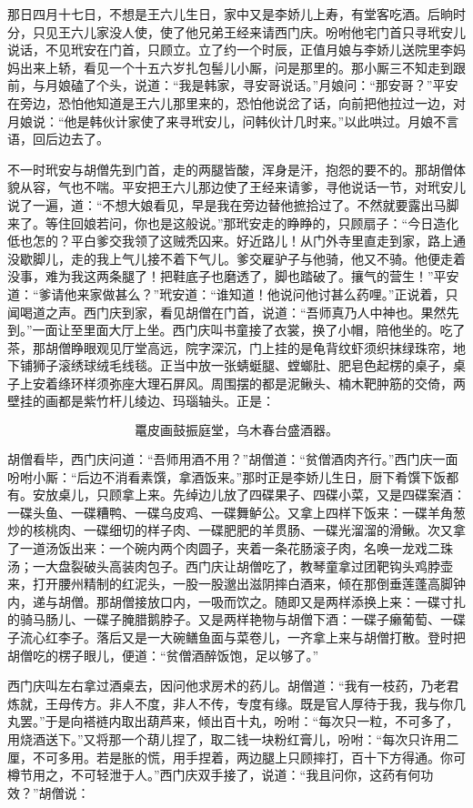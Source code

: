 那日四月十七日，不想是王六儿生日，家中又是李娇儿上寿，有堂客吃酒。后晌时分，只见王六儿家没人使，使了他兄弟王经来请西门庆。吩咐他宅门首只寻玳安儿说话，不见玳安在门首，只顾立。立了约一个时辰，正值月娘与李娇儿送院里李妈妈出来上轿，看见一个十五六岁扎包髻儿小厮，问是那里的。那小厮三不知走到跟前，与月娘磕了个头，说道：“我是韩家，寻安哥说话。”月娘问：“那安哥？”平安在旁边，恐怕他知道是王六儿那里来的，恐怕他说岔了话，向前把他拉过一边，对月娘说：“他是韩伙计家使了来寻玳安儿，问韩伙计几时来。”以此哄过。月娘不言语，回后边去了。

不一时玳安与胡僧先到门首，走的两腿皆酸，浑身是汗，抱怨的要不的。那胡僧体貌从容，气也不喘。平安把王六儿那边使了王经来请爹，寻他说话一节，对玳安儿说了一遍，道：“不想大娘看见，早是我在旁边替他摭拾过了。不然就要露出马脚来了。等住回娘若问，你也是这般说。”那玳安走的睁睁的，只顾扇子：“今日造化低也怎的？平白爹交我领了这贼秃囚来。好近路儿！从门外寺里直走到家，路上通没歇脚儿，走的我上气儿接不着下气儿。爹交雇驴子与他骑，他又不骑。他便走着没事，难为我这两条腿了！把鞋底子也磨透了，脚也踏破了。攘气的营生！”平安道：“爹请他来家做甚么？”玳安道：“谁知道！他说问他讨甚么药哩。”正说着，只闻喝道之声。西门庆到家，看见胡僧在门首，说道：“吾师真乃人中神也。果然先到。”一面让至里面大厅上坐。西门庆叫书童接了衣裳，换了小帽，陪他坐的。吃了茶，那胡僧睁眼观见厅堂高远，院字深沉，门上挂的是龟背纹虾须织抹绿珠帘，地下铺狮子滚绣球绒毛线毯。正当中放一张蜻蜓腿、螳螂肚、肥皂色起楞的桌子，桌子上安着绦环样须弥座大理石屏风。周围摆的都是泥鳅头、楠木靶肿筋的交倚，两壁挂的画都是紫竹杆儿绫边、玛瑙轴头。正是：

\[
鼍皮画鼓振庭堂，乌木春台盛酒器。
\]

胡僧看毕，西门庆问道：“吾师用酒不用？”胡僧道：“贫僧酒肉齐行。”西门庆一面吩咐小厮：“后边不消看素馔，拿酒饭来。”那时正是李娇儿生日，厨下肴馔下饭都有。安放桌儿，只顾拿上来。先绰边儿放了四碟果子、四碟小菜，又是四碟案酒：一碟头鱼、一碟糟鸭、一碟乌皮鸡、一碟舞鲈公。又拿上四样下饭来：一碟羊角葱炒的核桃肉、一碟细切的\textShiJie\textShiHe 样子肉、一碟肥肥的羊贯肠、一碟光溜溜的滑鳅。次又拿了一道汤饭出来：一个碗内两个肉圆子，夹着一条花肠滚子肉，名唤一龙戏二珠汤；一大盘裂破头高装肉包子。西门庆让胡僧吃了，教琴童拿过团靶钩头鸡脖壶来，打开腰州精制的红泥头，一股一股邈出滋阴摔白酒来，倾在那倒垂莲蓬高脚钟内，递与胡僧。那胡僧接放口内，一吸而饮之。随即又是两样添换上来：一碟寸扎的骑马肠儿、一碟子腌腊鹅脖子。又是两样艳物与胡僧下酒：一碟子癞葡萄、一碟子流心红李子。落后又是一大碗鳝鱼面与菜卷儿，一齐拿上来与胡僧打散。登时把胡僧吃的楞子眼儿，便道：“贫僧酒醉饭饱，足以够了。”

西门庆叫左右拿过酒桌去，因问他求房术的药儿。胡僧道：“我有一枝药，乃老君炼就，王母传方。非人不度，非人不传，专度有缘。既是官人厚待于我，我与你几丸罢。”于是向褡裢内取出葫芦来，倾出百十丸，吩咐：“每次只一粒，不可多了，用烧酒送下。”又将那一个葫儿捏了，取二钱一块粉红膏儿，吩咐：“每次只许用二厘，不可多用。若是胀的慌，用手捏着，两边腿上只顾摔打，百十下方得通。你可樽节用之，不可轻泄于人。”西门庆双手接了，说道：“我且问你，这药有何功效？”胡僧说：

